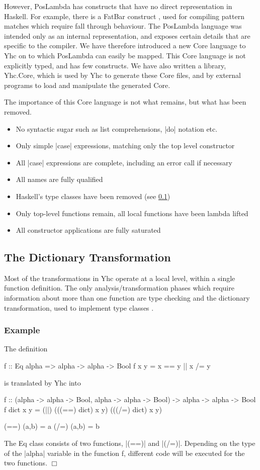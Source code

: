 \documentclass[preprint]{sigplanconf}
\let\cite=\citep
\newcommand{\C}[1]{\textsf{#1}}
\newcounter{exmp}
\newcommand{\yesexample}{\subsubsection*{Example \arabic{exmp}}\addtocounter{exmp}{1}}
\newcommand{\noexample}{\hfill$\Box$}
\newenvironment{example}{\yesexample}{\noexample}
\begin{document}
However, PosLambda has constructs that have no direct representation in Haskell. For example, there is a FatBar construct \cite{spj:implementation}, used for compiling pattern matches which require fall through behaviour. The PosLambda language was intended only as an internal representation, and exposes certain details that are specific to the compiler. We have therefore introduced a new Core language to Yhc on to which PosLambda can easily be mapped. This Core language is not explicitly typed, and has few constructs. We have also written a library, Yhc.Core, which is used by Yhc to generate these Core files, and by external programs to load and manipulate the generated Core.

The importance of this Core language is not what remains, but what has been removed.

\begin{itemize}
\item No syntactic sugar such as list comprehensions, |do| notation etc.
\item Only simple |case| expressions, matching only the top level constructor
\item All |case| expressions are complete, including an \C{error} call if necessary
\item All names are fully qualified
\item Haskell's type classes have been removed (see \ref{sec:dict})
\item Only top-level functions remain, all local functions have been lambda lifted
\item All constructor applications are fully saturated
\end{itemize}

\subsection{The Dictionary Transformation}
\label{sec:dict}

Most of the transformations in Yhc operate at a local level, within a single function definition. The only analysis/transformation phases which require information about more than one function are type checking and the dictionary transformation, used to implement type classes \citep{wadler:type_classes}.

\begin{example}
The definition

\begin{code}
f :: Eq alpha => alpha -> alpha -> Bool
f x y = x == y || x /= y
\end{code}

\noindent is translated by Yhc into

\begin{code}
f :: (alpha -> alpha -> Bool, alpha -> alpha -> Bool) -> alpha -> alpha -> Bool
f dict x y = (||) (((==) dict) x y) (((/=) dict) x y)

(==) (a,b) = a
(/=) (a,b) = b
\end{code}

The \C{Eq} class consists of two functions, |(==)| and |(/=)|. Depending on the type of the |alpha| variable in the function \C{f}, different code will be executed for the two functions.
\end{example}
\end{document}
